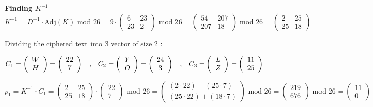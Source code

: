 \textbf{Finding \(K^{-1}\)}\\[0.1cm]
\[K^{-1} = D^{-1} \cdot \text{Adj}(K) \text{ mod } 26 = 9 \cdot \begin{pmatrix}
    6 & 23\\
    23 & 2
    \end{pmatrix} \text{ mod } 26 =  \begin{pmatrix}
    54 & 207\\
    207 & 18
\end{pmatrix} \text{ mod } 26 = \boxed {
\begin{pmatrix}
    2 & 25\\
    25 & 18
\end{pmatrix}
}\]

\vspace{0.5cm}
Dividing the ciphered text into 3 vector of size 2 :

\[
C_1 = \left(\begin{array}{c} W \\ H \end{array}\right) 
= \left(\begin{array}{c} 22 \\ 7 \end{array}\right)
\hspace{0.3cm},\hspace{0.3cm}
C_2 = \left(\begin{array}{c} Y \\ O \end{array}\right) 
= \left(\begin{array}{c} 24 \\ 3 \end{array}\right)
\hspace{0.3cm},\hspace{0.3cm}
C_3 = \left(\begin{array}{c} L \\ Z \end{array}\right) 
= \left(\begin{array}{c} 11 \\ 25 \end{array}\right)
\]

\[
p_1 = K^{-1} \cdot C_1 = \begin{pmatrix} 2 & 25 \\ 25 & 18 \end{pmatrix} \cdot \begin{pmatrix} 22 \\ 7
\end{pmatrix} \text{ mod } 26 = \begin{pmatrix} (2 \cdot 22) + (25 \cdot 7) \\ (25 \cdot 22) +
(18 \cdot 7) \end{pmatrix} \text{ mod } 26 = \begin{pmatrix} 219 \\ 676 \end{pmatrix}
\text{ mod } 26 = \boxed{\begin{pmatrix} 11 \\ 0 \end{pmatrix}}
\]

